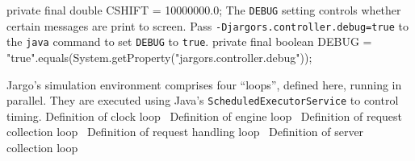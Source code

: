 \documentclass{article}
\newcommand{\hi}[1]{\noindent {\bf #1}}     %
\def\nwendcode{\endtrivlist \endgroup}      %
\let\nwdocspar=\par
\begin{document}
\nwenddocs{}\plusendmoddef
private final double CSHIFT = 10000000.0;
\eatline
{}\nwendcode{}The {\tt{}\protect{}DEBUG} setting controls whether certain messages are print to screen.
Pass {\tt{}-Djargors.controller.debug=true} to the {\tt{}java} command to set
{\tt{}\protect{}DEBUG} to {\tt{}true}.
\nwenddocs{}\plusendmoddef
private final boolean DEBUG = "true".equals(System.getProperty("jargors.controller.debug"));
\eatline
{}\nwendcode{}\nwdocspar
\hi{Loops.} Jargo's simulation environment comprises four ``loops'', defined
here, running in parallel. They are executed using Java's
{\tt{}ScheduledExecutorService} to control timing.
\nwenddocs{}\endmoddef{}
\LA{}Definition of clock loop~{\nwtagstyle{}}\RA{}
\LA{}Definition of engine loop~{\nwtagstyle{}}\RA{}
\LA{}Definition of request collection loop~{\nwtagstyle{}}\RA{}
\LA{}Definition of request handling loop~{\nwtagstyle{}}\RA{}
\LA{}Definition of server collection loop~{\nwtagstyle{}}\RA{}
\nwendcode{}\nwdocspar
\end{document}
